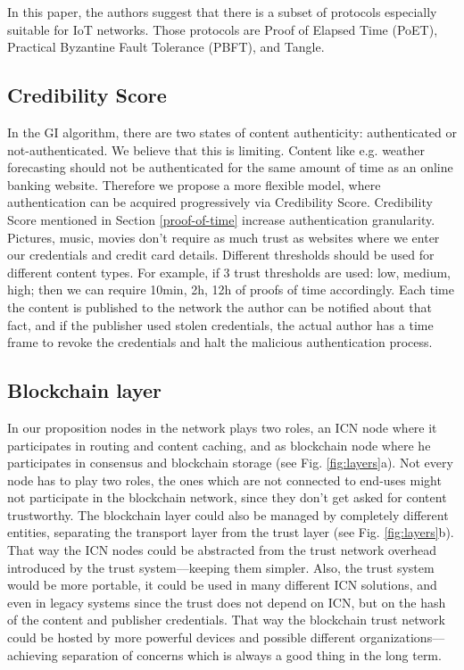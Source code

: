 \documentclass[nostrict]{szablonPG}
\begin{document}
In this paper, the authors suggest that there is a subset of protocols especially suitable for IoT networks. Those protocols are Proof of Elapsed Time (PoET), Practical Byzantine Fault Tolerance (PBFT), and Tangle.

\subsection{Credibility Score}
In the GI algorithm, there are two states of content authenticity: authenticated or not-authenticated. We believe that this is limiting. Content like e.g. weather forecasting should not be authenticated for the same amount of time as an online banking website. Therefore we propose a more flexible model, where authentication can be acquired progressively via Credibility Score. Credibility Score mentioned in Section \ref{proof-of-time} increase authentication granularity. Pictures, music, movies don't require as much trust as websites where we enter our credentials and credit card details. Different thresholds should be used for different content types. For example, if 3 trust thresholds are used: low, medium, high; then we can require 10min, 2h, 12h of proofs of time accordingly. Each time the content is published to the network the author can be notified about that fact, and if the publisher used stolen credentials, the actual author has a time frame to revoke the credentials and halt the malicious authentication process.

\subsection{Blockchain layer}
In our proposition nodes in the network plays two roles, an ICN node where it participates in routing and content caching, and as blockchain node where he participates in consensus and blockchain storage (see Fig. \ref{fig:layers}a). Not every node has to play two roles, the ones which are not connected to end-uses might not participate in the blockchain network, since they don't get asked for content trustworthy. 
The blockchain layer could also be managed by completely different entities, separating the transport layer from the trust layer (see Fig. \ref{fig:layers}b). That way the ICN nodes could be abstracted from the trust network overhead introduced by the trust system––keeping them simpler. Also, the trust system would be more portable, it could be used in many different ICN solutions, and even in legacy systems since the trust does not depend on ICN, but on the hash of the content and publisher credentials. That way the blockchain trust network could be hosted by more powerful devices and possible different organizations––achieving separation of concerns which is always a good thing in the long term.
\end{document}
